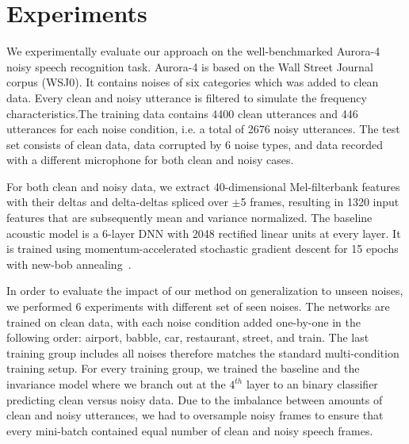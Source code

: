 \documentclass{article}
\begin{document}

\section{Experiments}
\label{sec:experiments}
We experimentally evaluate our approach   
on the well-benchmarked Aurora-4 \citep{parihar2002aurora} noisy speech recognition task. Aurora-4
is based on the Wall Street Journal corpus (WSJ0). It contains noises of 
six categories which was added to clean data. Every clean and noisy utterance is filtered to simulate the frequency characteristics.The training
data  contains 4400 clean utterances and 446 utterances for each noise condition,
i.e. a total of 2676 noisy utterances.
The test set consists of clean data, data corrupted by 6 noise types, and data recorded with a different microphone for both clean and noisy cases.

For both clean and noisy data, we extract 40-dimensional Mel-filterbank features with their deltas and 
delta-deltas spliced over $\pm$5 frames, resulting in 1320 input 
features that are subsequently mean and variance normalized. The baseline acoustic model is a 6-layer 
DNN with 2048 rectified linear units at every layer. It is trained using momentum-accelerated stochastic gradient descent for 15 epochs with new-bob 
annealing~\citep[as in][]{morgan1995continuous,sainath2011making}.


In order to evaluate the impact of our method on generalization to unseen noises,
we performed 6 experiments with different set of seen noises. The networks are trained
on clean data, with each noise condition added one-by-one in the following order: airport, babble, car, 
restaurant, street, and train. The last training group includes all noises therefore matches the
standard multi-condition training setup. For every training group, we trained the
baseline and the invariance model where we branch out at the $4^{th}$ layer to an  
binary classifier predicting clean versus noisy data. Due to the imbalance between amounts of clean and
noisy utterances, we had to oversample noisy frames to ensure that every mini-batch contained
equal number of clean and noisy speech frames.
\end{document}

